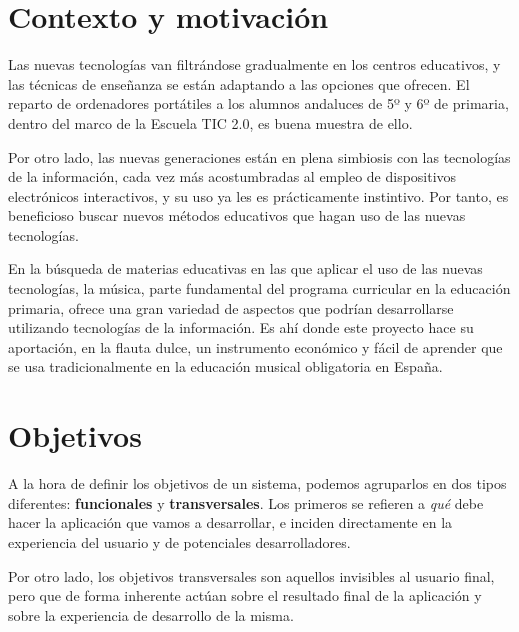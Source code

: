 \section{Contexto y motivación}
Las nuevas tecnologías van filtrándose gradualmente en los centros
educativos, y las técnicas de enseñanza se están adaptando a las
opciones que ofrecen. El reparto de ordenadores portátiles a los
alumnos andaluces de 5º y 6º de primaria, dentro del marco de la
Escuela TIC 2.0, es buena muestra de ello. 

Por otro lado, las nuevas generaciones están en plena simbiosis con las
tecnologías de la información, cada vez más acostumbradas al empleo de
dispositivos electrónicos interactivos, y su uso ya les es prácticamente
instintivo. Por tanto, es beneficioso buscar nuevos métodos educativos que hagan
uso de las nuevas tecnologías.

En la búsqueda de materias educativas en las que aplicar el uso de las nuevas
tecnologías, la música, parte fundamental del programa curricular en la
educación primaria, ofrece una gran variedad de aspectos que podrían
desarrollarse utilizando tecnologías de la información. Es ahí donde este
proyecto hace su aportación, en la flauta dulce, un instrumento económico y
fácil de aprender que se usa tradicionalmente en la educación musical
obligatoria en España.

\section{Objetivos}
\label{sec:objetivos}

A la hora de definir los objetivos de un sistema, podemos agruparlos
en dos tipos diferentes: \textbf{funcionales} y
\textbf{transversales}. Los primeros se refieren a \textit{qué} debe
hacer la aplicación que vamos a desarrollar, e inciden
directamente en la experiencia del usuario y de potenciales
desarrolladores.

Por otro lado, los objetivos transversales son aquellos invisibles al
usuario final, pero que de forma inherente actúan sobre el resultado
final de la aplicación y sobre la experiencia de desarrollo de la misma.

